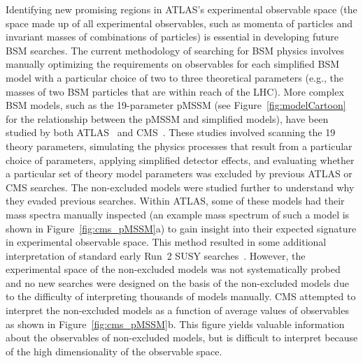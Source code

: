 \documentclass[letter, USenglish, 11pt, subfigure]{article}
\begin{document}
Identifying new promising regions in ATLAS's experimental observable space (the space made up of all experimental observables, such as momenta of particles and invariant masses of combinations of particles) is essential in developing future BSM searches.
The current methodology of searching for BSM physics involves manually optimizing the requirements on observables for each simplified BSM model with a particular choice of two to three theoretical parameters (e.g., the masses of two BSM particles that are within reach of the LHC). More complex BSM models, such as the 19-parameter pMSSM (see Figure~\ref{fig:modelCartoon} for the relationship between the pMSSM and simplified models), have been studied by both ATLAS~\cite{ATLAS_pMSSM} and CMS~\cite{CMS_pMSSM}. These studies involved scanning the 19 theory parameters, simulating the physics processes that result from a particular choice of parameters, applying simplified detector effects, and evaluating whether a particular set of theory model parameters was excluded by previous ATLAS or CMS searches. The non-excluded models were studied further to understand why they evaded previous searches. Within ATLAS, some of these models had their mass spectra manually inspected (an example mass spectrum of such a model is shown in Figure~\ref{fig:cms_pMSSM}a) to gain insight into their expected signature in experimental observable space. This method resulted in some additional interpretation of standard early Run~2 SUSY searches~\cite{stopEarlyRun2}. However, the experimental space of the non-excluded models was not systematically probed and no new searches were designed on the basis of the non-excluded models due to the difficulty of interpreting thousands of models manually. CMS attempted to interpret the non-excluded models as a function of average values of observables as shown in Figure~\ref{fig:cms_pMSSM}b. This figure yields valuable information about the observables of non-excluded models, but is difficult to interpret because of the high dimensionality of the observable space. 
\end{document}
